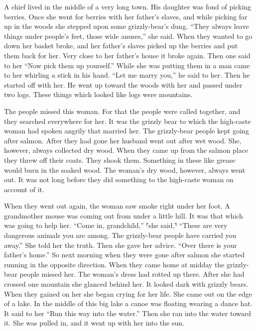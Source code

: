 A chief lived in the middle of a very long town.
His daughter was fond of picking berries.
Once she went for berries with her father’s slaves,
and while picking far up in the woods she stepped upon some grizzly-bear’s dung.
\qqk{}“They always leave things under people’s feet, those wide anuses,”
she said.
When they wanted to go down her basket broke,
and her father’s slaves picked up the berries and put them back for her.
Very close to her father’s house it broke again.
Then one said to her
\qqk{}“Now pick them up yourself.”
While she was putting them in
a man came to her
whirling a stick in his hand.
\qqk{}“Let me marry you,” he said to her.
Then he started off with her.
He went up toward the woods with her and passed under two logs.
These things which looked like logs were mountains.

The people missed this woman.
For that the people were called together, and they searched everywhere for her.
It was the grizzly bear to which the high-caste woman had spoken angrily that married her.
The grizzly-bear people kept going after salmon.
After they had gone her husband went out after wet wood.
She, however, always collected dry wood.
When they came up from the salmon place they threw off their coats.
They shook them.
Something in these like grease would burn in the soaked wood.
The woman’s dry wood, however, always went out.
It was not long before they did something to the high-caste woman on account of it.

When they went out again,
the woman saw smoke right under her foot.
A grandmother mouse was coming out from under a little hill.
It was that which was going to help her.
\qqk{}“Come in, grandchild,” ⸢she said,⸣
\qqk{}“These are very dangerous animals you are among.
The grizzly-bear people have carried you away.”
She told her the truth.
Then she gave her advice. “Over there is your father’s home.”
So next morning when they were gone after salmon
she started running in the opposite direction.
When they came home at midday the grizzly-bear people missed her.
The woman’s dress had rotted up there.
After she had crossed one mountain she glanced behind her.
It looked dark with grizzly bears.
When they gained on her she began crying for her life.
She came out on the edge of a lake.
In the middle of this big lake a canoe was floating wearing a dance hat.
It said to her “Run this way into the water.”
Then she ran into the water toward it.
She was pulled in,
and it went up with her into the sun.

